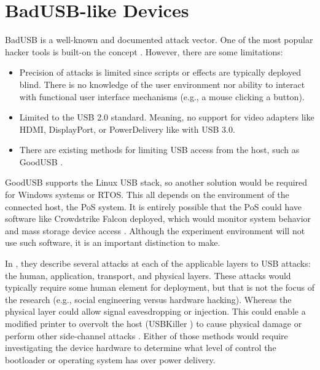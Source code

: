 \section{BadUSB-like Devices}


BadUSB is a well-known and documented attack vector. One of the most popular hacker tools is built-on the concept \autocite{hak5BashBunny}. However, there are some limitations:

\begin{itemize}
  \item Precision of attacks is limited since scripts or effects are typically deployed blind. There is no knowledge of the user environment nor ability to interact with functional user interface mechanisms (e.g., a mouse clicking a button). 
  \item Limited to the USB 2.0 standard. Meaning, no support for video adapters like HDMI, DisplayPort, or PowerDelivery like with USB 3.0. 
  \item There are existing methods for limiting USB access from the host, such as GoodUSB \autocite{tianDefendingMaliciousUSB2015}.
\end{itemize}

GoodUSB supports the Linux USB stack, so another solution would be required for Windows systems or RTOS. This all depends on the environment of the connected host, the PoS system. It is entirely possible that the PoS could have software like Crowdstrike Falcon deployed, which would monitor system behavior and mass storage device access \autocite{backer2021sdn}. Although the experiment environment will not use such software, it is an important distinction to make.

In \autocite*{tianSoKPlugPray2018}, they describe several attacks at each of the applicable layers to USB attacks: the human, application, transport, and physical layers. These attacks would typically require some human element for deployment, but that is not the focus of the research (e.g., social engineering versus hardware hacking). Whereas the physical layer could allow signal eavesdropping or injection. This could enable a modified printer to overvolt the host (USBKiller \autocite{USBKillDevices}) to cause physical damage or perform other side-channel attacks \autocite*{sridharEMIIssuesUniversal2003}. Either of those methods would require investigating the device hardware to determine what level of control the bootloader or operating system has over power delivery.



